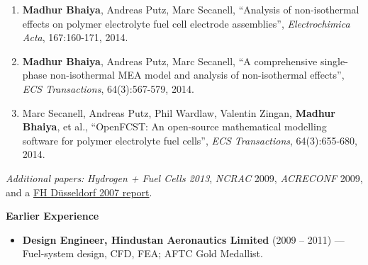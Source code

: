 \documentclass[a4paper,10pt]{article}
\newcommand{\resheading}[1]{%
  \par\vspace{10pt}%
  \noindent\colorbox{headbg}{\parbox{\dimexpr\linewidth-2\fboxsep\relax}{%
    \strut\color{accent}\large\bfseries #1}}\par%
  \vspace{5pt}%
}
\begin{document}
{\small
\begin{enumerate}
  \item \textbf{Madhur Bhaiya}, Andreas Putz, Marc Secanell, ``Analysis of non-isothermal effects on polymer electrolyte fuel cell electrode assemblies'', \textit{Electrochimica Acta}, 167:160-171, 2014.
  \item \textbf{Madhur Bhaiya}, Andreas Putz, Marc Secanell, ``A comprehensive single-phase non-isothermal MEA model and analysis of non-isothermal effects'', \textit{ECS Transactions}, 64(3):567-579, 2014.
  \item Marc Secanell, Andreas Putz, Phil Wardlaw, Valentin Zingan, \textbf{Madhur Bhaiya}, et al., ``OpenFCST: An open-source mathematical modelling software for polymer electrolyte fuel cells'', \textit{ECS Transactions}, 64(3):655-680, 2014.
\end{enumerate}
\vspace{3pt}
\textit{Additional papers:} \textit{Hydrogen + Fuel Cells 2013}, \textit{NCRAC} 2009, \textit{ACRECONF} 2009, and a \href{http://fhdd.opus.hbz-nrw.de/volltexte/2008/423}{FH D\"usseldorf 2007 report}.\par
}

\resheading{Earlier Experience}

\begin{itemize}
  \item \textbf{Design Engineer, Hindustan Aeronautics Limited} {\color{muted}(2009 -- 2011)} --- Fuel-system design, CFD, FEA; AFTC Gold Medallist.
\end{itemize}
\end{document}
